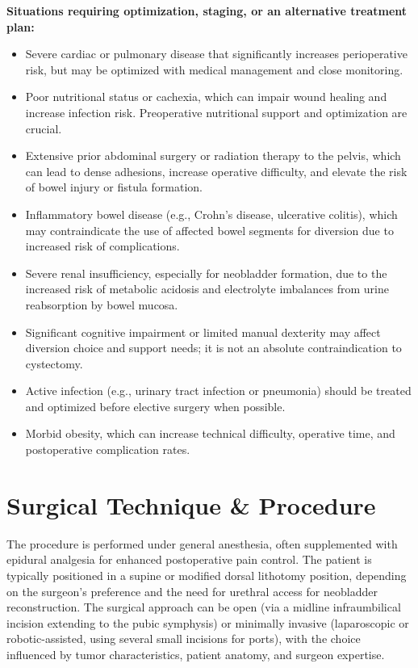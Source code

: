 \textbf{Situations requiring optimization, staging, or an alternative treatment plan:}
\begin{itemize}
  \item Severe cardiac or pulmonary disease that significantly increases perioperative risk, but may be optimized with medical management and close monitoring.
  
  \item Poor nutritional status or cachexia, which can impair wound healing and increase infection risk. Preoperative nutritional support and optimization are crucial.
  
  \item Extensive prior abdominal surgery or radiation therapy to the pelvis, which can lead to dense adhesions, increase operative difficulty, and elevate the risk of bowel injury or fistula formation.
  
  \item Inflammatory bowel disease (e.g., Crohn's disease, ulcerative colitis), which may contraindicate the use of affected bowel segments for diversion due to increased risk of complications.
  
  \item Severe renal insufficiency, especially for neobladder formation, due to the increased risk of metabolic acidosis and electrolyte imbalances from urine reabsorption by bowel mucosa.
  
  \item Significant cognitive impairment or limited manual dexterity may affect diversion choice and support needs; it is not an absolute contraindication to cystectomy.
  
  \item Active infection (e.g., urinary tract infection or pneumonia) should be treated and optimized before elective surgery when possible.
  
  \item Morbid obesity, which can increase technical difficulty, operative time, and postoperative complication rates.
\end{itemize}

\section*{Surgical Technique \& Procedure}
The procedure is performed under general anesthesia, often supplemented with epidural analgesia for enhanced postoperative pain control. The patient is typically positioned in a supine or modified dorsal lithotomy position, depending on the surgeon's preference and the need for urethral access for neobladder reconstruction. The surgical approach can be open (via a midline infraumbilical incision extending to the pubic symphysis) or minimally invasive (laparoscopic or robotic-assisted, using several small incisions for ports), with the choice influenced by tumor characteristics, patient anatomy, and surgeon expertise.

